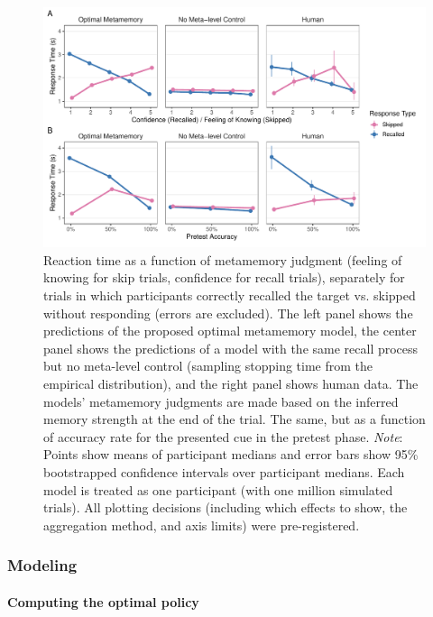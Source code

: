 \begin{figure}[t!]
  \includegraphics[scale=.65]{figs/memory/exp1/rt.pdf}
  \caption{%
     Reaction time as a function of metamemory judgment (feeling of knowing for skip trials, confidence for recall trials), separately for trials in which participants correctly recalled the target vs. skipped without responding (errors are excluded). The left panel shows the predictions of the proposed optimal metamemory model, the center panel shows the predictions of a model with the same recall process but no meta-level control (sampling stopping time from the empirical distribution), and the right panel shows human data. The models' metamemory judgments are made based on the inferred memory strength at the end of the trial.
     The same, but as a function of accuracy rate for the presented cue in the pretest phase. 
    \emph{Note}: Points show means of participant medians and error bars show 95\% bootstrapped confidence intervals over participant medians. Each model is treated as one participant (with one million simulated trials). All plotting decisions (including which effects to show, the aggregation method, and axis limits) were pre-registered.
  }
  \label{fig:exp1_rt}
\end{figure}

\subsubsection{Modeling}

\paragraph{Computing the optimal policy}

